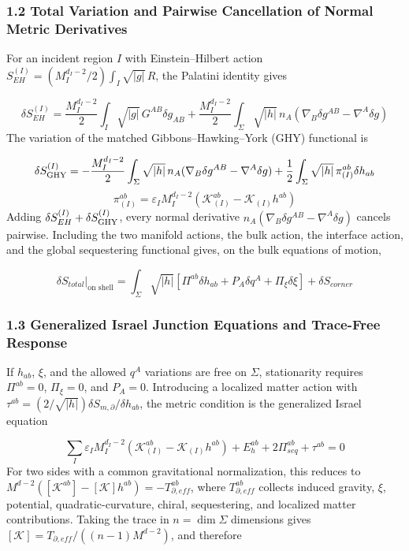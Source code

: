 \documentclass[aps,prd,onecolumn,superscriptaddress,nofootinbib,longbibliography,10pt]{revtex4-2}
\begin{document}
  
\subsubsection*{1.2 Total Variation and Pairwise Cancellation of Normal Metric Derivatives}

  For an incident region \(I\) with Einstein–Hilbert action \(S_{EH}^{(I)} = (M_I^{d_I - 2}/2)\int_I \sqrt{|g|}\, R\), the Palatini identity gives


  \[ \delta S_{EH}^{(I)} = \frac{M_I^{d_I - 2}}{2}\int_I \sqrt{|g|}\, G^{AB}\delta g_{AB} + \frac{M_I^{d_I - 2}}{2}\int_\Sigma \sqrt{|h|}\, n_A(\nabla_B \delta g^{AB} - \nabla^A \delta g) \]
  The variation of the matched Gibbons–Hawking–York (GHY) functional is


  \[ \delta S_{{\small \mathrm{GHY}}}^{{\small (I)}} = -\frac{M_I^{d_I - 2}}{2}\int_\Sigma \sqrt{|h|}\, n_A(\nabla_B \delta g^{AB} - \nabla^A \delta g) + \frac{1}{2}\int_\Sigma \sqrt{|h|}\, \pi_{(I)}^{ab}\delta h_{ab} \]
  \[ \pi_{(I)}^{ab} = \varepsilon_I M_I^{d_I - 2}(\mathcal{K}_{(I)}^{ab} - \mathcal{K}_{(I)}h^{ab}) \]
  Adding \(\delta S_{EH}^{(I)} + \delta S_{{\small \mathrm{GHY}}}^{{\small (I)}}\), every normal derivative \(n_A(\nabla_B \delta g^{AB} - \nabla^A \delta g)\) cancels pairwise. Including the two manifold actions, the bulk action, the interface action, and the global sequestering functional gives, on the bulk equations of motion,


  \[ \delta S_{total}|_{\text{on shell}} = \int_\Sigma \sqrt{|h|} \left[ \Pi^{ab}\delta h_{ab} + P_A \delta q^A + \Pi_\xi \delta\xi \right] + \delta S_{corner} \]

  
\subsubsection*{1.3 Generalized Israel Junction Equations and Trace-Free Response}

  If \(h_{ab}\), \(\xi\), and the allowed \(q^A\) variations are free on \(\Sigma\), stationarity requires \(\Pi^{ab} = 0\), \(\Pi_\xi = 0\), and \(P_A = 0\). Introducing a localized matter action with \(\tau^{ab} = (2/\sqrt{|h|})\delta S_{m,\partial}/\delta h_{ab}\), the metric condition is the generalized Israel equation


  \[ \sum_I \varepsilon_I M_I^{d_I - 2}(\mathcal{K}_{(I)}^{ab} - \mathcal{K}_{(I)}h^{ab}) + E_h^{ab} + 2\Pi_{seq}^{ab} + \tau^{ab} = 0 \]
  For two sides with a common gravitational normalization, this reduces to \(M^{d-2}([\mathcal{K}^{ab}] - [\mathcal{K}]h^{ab}) = -T^{ab}_{\partial,eff}\), where \(T^{ab}_{\partial,eff}\) collects induced gravity, \(\xi\), potential, quadratic-curvature, chiral, sequestering, and localized matter contributions. Taking the trace in \(n = \dim\Sigma\) dimensions gives \([\mathcal{K}] = T_{\partial,eff}/((n-1)M^{d-2})\), and therefore
\end{document}
